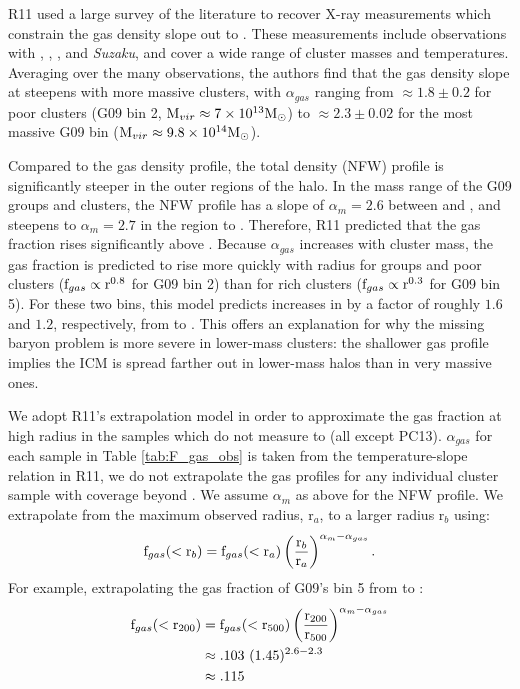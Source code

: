 R11 used a large survey of the literature to recover X-ray
measurements which constrain the gas density slope out to
\rfive{}. These measurements include observations with \Rosat{},
\Chandra, \XMM, and \textit{Suzaku}, and cover a wide range of cluster
masses and temperatures. Averaging over the many observations, the
authors find that the gas density slope at \rfive{} steepens with more
massive clusters, with $\alpha_{gas}$ ranging from $\approx 1.8 \pm
0.2$ for poor clusters (G09 bin 2, $\textrm{M\ensuremath{_{vir}}} \approx 7\times 10^{13}\textrm{M}_\odot$)
to $\approx 2.3 \pm 0.02$ for the most massive G09 bin ($\textrm{M\ensuremath{_{vir}}}
\approx9.8\times 10^{14}\textrm{M}_\odot$). 

Compared to the gas density profile, the total density (NFW) profile
is significantly steeper in the outer regions of the halo. In the mass
range of the G09 groups and clusters, the NFW profile has a slope of
$\alpha_m = 2.6$ between \rfive{} and \rtwo{}, and steepens to
$\alpha_m = 2.7$ in the region \rtwo{} to \rvir{}. Therefore, R11
predicted that the gas fraction rises significantly above
\rfive{}. Because $\alpha_{gas}$ increases with cluster mass, the gas
fraction is predicted to rise more quickly with radius for groups and
poor clusters ($\textrm{f\ensuremath{_{gas}}}\propto \textrm{r}^{0.8}$ for G09 bin 2) than for
rich clusters ($\textrm{f\ensuremath{_{gas}}} \propto \textrm{r}^{0.3}$ for G09 bin 5). For
these two bins, this model predicts increases in \fg{} by a factor of
roughly $1.6$ and $1.2$, respectively, from \rfive{} to \rvir{}. This
offers an explanation for why the missing baryon problem is more
severe in lower-mass clusters: the shallower gas profile implies the
ICM is spread farther out in lower-mass halos than in very massive
ones.

We adopt R11's extrapolation model in order to approximate the gas
fraction at high radius in the samples which do not measure \fg{} to
\rvir{} (all except PC13). $\alpha_{gas}$ for each sample in Table
\ref{tab:F_gas_obs} is taken from the temperature-slope relation in R11,
we do not extrapolate the gas profiles for any individual cluster
sample with coverage beyond \rfive{}. We assume $\alpha_m$ as
above for the NFW profile. We extrapolate \fg{} from the maximum
observed radius, r$_a$, to a larger radius r$_b$ using:
\begin{equation}
\textrm{f\ensuremath{_{gas}}}(<\textrm{r}_b) =
\textrm{f\ensuremath{_{gas}}}(<\textrm{r}_a)\left(\frac{\textrm{r}_b}{\textrm{r}_a}\right)^{\alpha_m - \alpha_{gas}}.
\end{equation}
 For example, extrapolating the gas fraction of G09's bin 5 from \rfive{} to \rtwo{}:
\begin{align}
\textrm{f\ensuremath{_{gas}}}{}(<\textrm{r\ensuremath{_{200}}}) &=
\textrm{f\ensuremath{_{gas}}}{}(<\textrm{r\ensuremath{_{500}}})\left(\frac{\textrm{r\ensuremath{_{200}}}}{\textrm{r\ensuremath{_{500}}}}\right)^{\alpha_m -
  \alpha_{gas}} \nonumber\\
&\approx .103~(1.45)^{2.6 - 2.3} \nonumber \\
&\approx .115 \nonumber
\end{align}

